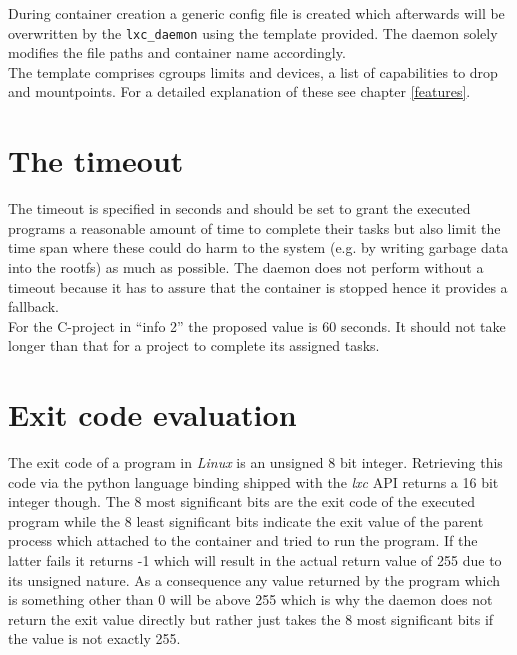 During container
creation a generic config file is created which afterwards will be overwritten by the \texttt{lxc\_daemon} using
the template provided.
The daemon solely modifies the file paths and container name accordingly.\\
The template comprises cgroups limits and devices, a list of capabilities to drop and mountpoints.
For a detailed explanation of these see chapter \ref{features}.

\section{The timeout}

The timeout is specified in seconds and should be set to grant the executed programs a reasonable amount of time to complete
their tasks but also limit the time span where these could do harm to the system (e.g. by
writing garbage data into the rootfs) as much as possible. The daemon does not perform without
a timeout because it has to assure that the container is stopped hence it provides a fallback.\\
For the C-project in ``info 2'' the proposed value is 60 seconds. It should not take longer than that for a
project to complete its assigned tasks.

\section{Exit code evaluation}

The exit code of a program in \textit{Linux} is an unsigned 8 bit integer. Retrieving this code via the python language binding
shipped with the \textit{lxc} API returns a 16 bit integer though. The 8
most significant bits are the exit code of the executed program while the 8 least significant bits indicate the exit
value of the parent process which attached to the container and tried to run the program.
If the latter fails it returns -1 which will result in the actual return value of
255 due to its unsigned nature. As a consequence any value returned by the program which is something other than 0 will be
above 255 which is why the daemon does not return the exit value directly but rather just takes the 8 most significant bits
if the value is not exactly 255.